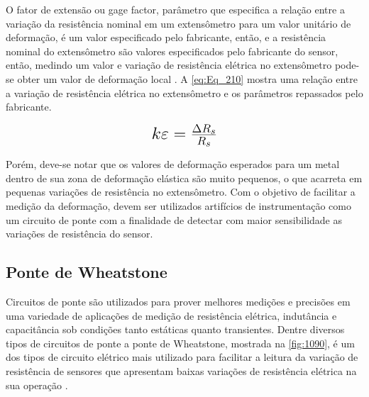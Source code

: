 O fator de extensão ou gage factor, parâmetro que especifica a relação entre a variação da resistência nominal em um extensômetro para um valor unitário
de deformação, é um valor especificado pelo fabricante, então, e a resistência nominal do extensômetro são valores especificados pelo fabricante do sensor,
então, medindo um valor e variação de resistência elétrica no extensômetro pode-se obter um valor de deformação local \autocite{Hollman2011}.
A \autoref{eq:Eq_210} mostra uma relação entre a variação de resistência elétrica no extensômetro e os parâmetros repassados pelo fabricante.

\begin{equation}\label{eq:Eq_210}%
\mbox{\fontsize{17.28}{21.6}\selectfont\( %
k \varepsilon = \frac{\Delta R_s }{R_s}
\)} %
\end{equation}

%
%
%
%
%

Porém, deve-se notar que os valores de deformação esperados para um metal dentro de sua zona de deformação elástica são muito pequenos, o que acarreta em pequenas
variações de resistência no extensômetro. Com o objetivo de facilitar a medição da deformação, devem ser utilizados artifícios de instrumentação como um circuito de ponte
com a finalidade de detectar com maior sensibilidade as variações de resistência do sensor.

\subsection{Ponte de Wheatstone}

Circuitos de ponte são utilizados para prover melhores medições e precisões em uma variedade de aplicações de medição de resistência elétrica, indutância e capacitância
sob condições tanto estáticas quanto transientes.
Dentre diversos tipos de circuitos de ponte a ponte de Wheatstone, mostrada na \autoref{fig:1090}, é um dos tipos de circuito elétrico
mais utilizado para facilitar a leitura da variação de resistência de sensores que apresentam baixas variações de resistência elétrica na sua operação \autocite{Hollman2011}.

